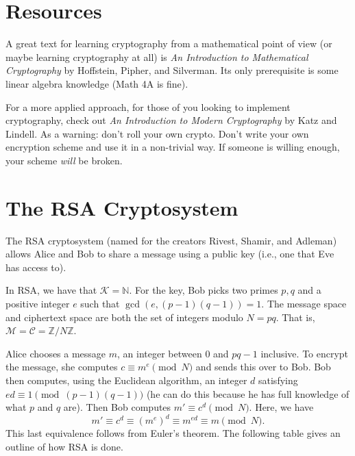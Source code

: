 \documentclass{article}
\theoremstyle{definition}
\theoremstyle{remark}
\newcommand{\NN}{\mathbb{N}}
\newcommand{\ZZ}{\mathbb{Z}}
\begin{document}
\section{Resources}

    A great text for learning cryptography from a mathematical point of view (or maybe learning cryptography at all) is \textit{An Introduction to Mathematical Cryptography} by Hoffstein, Pipher, and Silverman.
    Its only prerequisite is some linear algebra knowledge (Math 4A is fine).
    
    For a more applied approach, for those of you looking to implement cryptography, check out \textit{An Introduction to Modern Cryptography} by Katz and Lindell.
    As a warning: don't roll your own crypto.
    Don't write your own encryption scheme and use it in a non-trivial way.
    If someone is willing enough, your scheme \textit{will} be broken.

\section{The RSA Cryptosystem}

    The RSA cryptosystem (named for the creators Rivest, Shamir, and Adleman) allows Alice and Bob to share a message using a public key (i.e., one that Eve has access to).

    In RSA, we have that \(\mathcal{K}=\NN\).
    For the key, Bob picks two primes \(p,q\) and a positive integer \(e\) such that \(\gcd(e,(p-1)(q-1))=1\).
    The message space and ciphertext space are both the set of integers modulo \(N=pq\).
    That is, \(\mathcal{M}=\mathcal{C}=\ZZ/N\ZZ\).

    Alice chooses a message \(m\), an integer between 0 and \(pq-1\) inclusive.
    To encrypt the message, she computes \(c\equiv m^e\pmod{N}\) and sends this over to Bob.
    Bob then computes, using the Euclidean algorithm, an integer \(d\) satisfying \(ed\equiv 1\pmod{(p-1)(q-1)}\) (he can do this because he has full knowledge of what \(p\) and \(q\) are).
    Then Bob computes \(m'\equiv c^d\pmod{N}\).
    Here, we have
    \[m' \equiv c^d \equiv \left(m^e\right)^d \equiv m^{ed} \equiv m\pmod{N}.\]
    This last equivalence follows from Euler's theorem. The following table gives an outline of how RSA is done.
\end{document}
